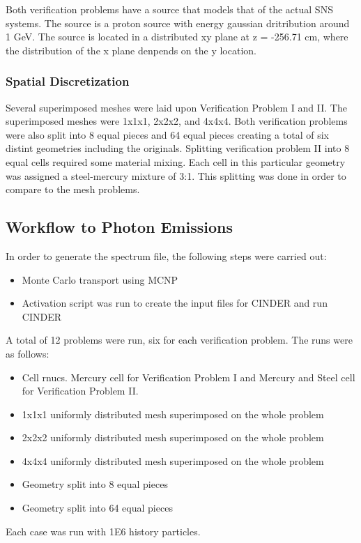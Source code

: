 Both verification problems have a source that models that of the
actual SNS systems. The source is a proton source with energy gaussian dritribution
around 1 GeV. The source is located in a distributed xy plane at z = -256.71 cm, 
where the distribution of the x plane denpends on the y location. 

\subsubsection{Spatial Discretization}
Several superimposed meshes were laid upon Verification Problem I and II. 
The superimposed meshes were 1x1x1, 2x2x2, and 4x4x4. Both verification problems
were also split into 8 equal pieces and 64 equal pieces creating a total of
six distint geometries including the originals. 
Splitting verification problem II into 8 equal cells required some material mixing. 
Each cell in this particular geometry was assigned a steel-mercury mixture
of 3:1. 
This splitting was done in order to compare to the mesh problems. 

\subsection{Workflow to Photon Emissions}
In order to generate the spectrum file, the following steps were carried out:
\begin{itemize}
\item Monte Carlo transport using MCNP 
\item Activation script was run to create the input files for CINDER and  run CINDER
\end{itemize}
A total of 12 problems were run, six for each verification problem. The runs were as follows:
\begin{itemize}
\item Cell rnucs. Mercury cell for Verification Problem I and Mercury and Steel cell for
Verification Problem II.
\item 1x1x1 uniformly distributed mesh superimposed on the whole problem
\item 2x2x2 uniformly distributed mesh superimposed on the whole problem
\item 4x4x4 uniformly distributed mesh superimposed on the whole problem
\item Geometry split into 8 equal pieces
\item Geometry split into 64 equal pieces
\end{itemize}
Each case was run with 1E6 history particles. 

\newpage
